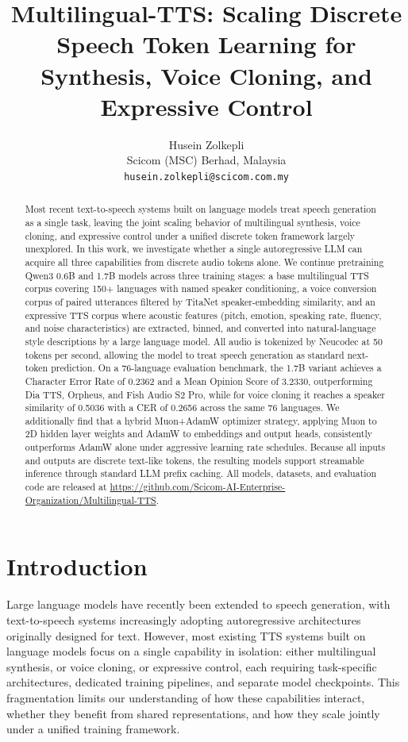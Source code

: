 \documentclass{article}
\title{Multilingual-TTS: Scaling Discrete Speech Token Learning for Synthesis, Voice Cloning, and Expressive Control}
\author{
  Husein Zolkepli \\
  Scicom (MSC) Berhad, Malaysia \\
  \texttt{husein.zolkepli@scicom.com.my}
}
\begin{document}
\maketitle

\begin{abstract}
Most recent text-to-speech systems built on language models treat speech generation as a single task, leaving the joint scaling behavior of multilingual synthesis, voice cloning, and expressive control under a unified discrete token framework largely unexplored. In this work, we investigate whether a single autoregressive LLM can acquire all three capabilities from discrete audio tokens alone. We continue pretraining Qwen3 0.6B and 1.7B models across three training stages: a base multilingual TTS corpus covering 150+ languages with named speaker conditioning, a voice conversion corpus of paired utterances filtered by TitaNet speaker-embedding similarity, and an expressive TTS corpus where acoustic features (pitch, emotion, speaking rate, fluency, and noise characteristics) are extracted, binned, and converted into natural-language style descriptions by a large language model. All audio is tokenized by Neucodec at 50 tokens per second, allowing the model to treat speech generation as standard next-token prediction. On a 76-language evaluation benchmark, the 1.7B variant achieves a Character Error Rate of 0.2362 and a Mean Opinion Score of 3.2330, outperforming Dia TTS, Orpheus, and Fish Audio S2 Pro, while for voice cloning it reaches a speaker similarity of 0.5036 with a CER of 0.2656 across the same 76 languages. We additionally find that a hybrid Muon+AdamW optimizer strategy, applying Muon to 2D hidden layer weights and AdamW to embeddings and output heads, consistently outperforms AdamW alone under aggressive learning rate schedules. Because all inputs and outputs are discrete text-like tokens, the resulting models support streamable inference through standard LLM prefix caching. All models, datasets, and evaluation code are released at \url{https://github.com/Scicom-AI-Enterprise-Organization/Multilingual-TTS}.
\end{abstract}

\section{Introduction}

Large language models have recently been extended to speech generation, with text-to-speech systems increasingly adopting autoregressive architectures originally designed for text. However, most existing TTS systems built on language models focus on a single capability in isolation: either multilingual synthesis, or voice cloning, or expressive control, each requiring task-specific architectures, dedicated training pipelines, and separate model checkpoints. This fragmentation limits our understanding of how these capabilities interact, whether they benefit from shared representations, and how they scale jointly under a unified training framework.
 
\end{document}
